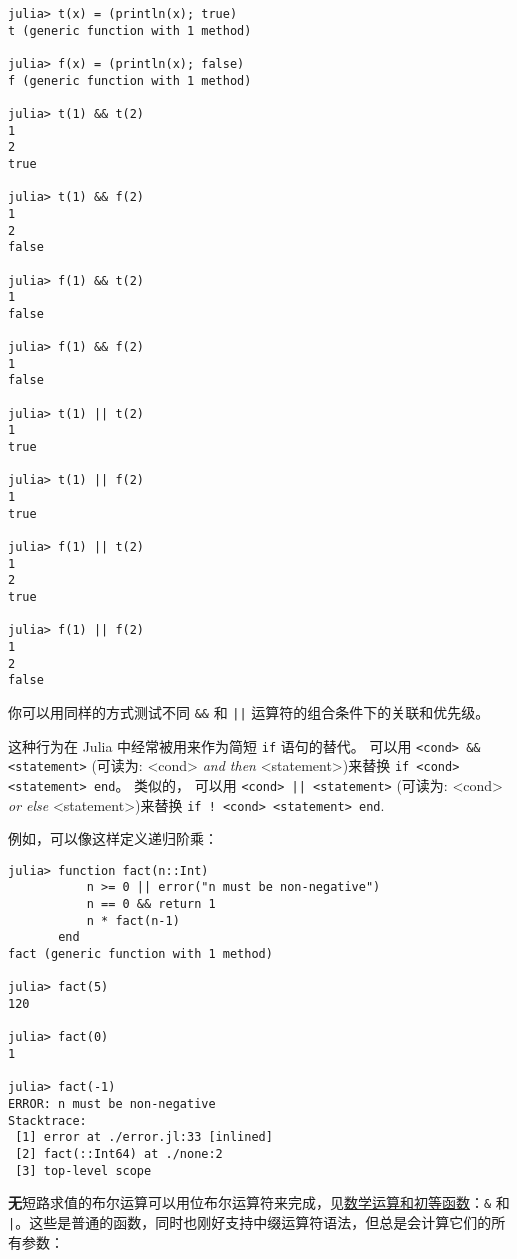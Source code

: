 \begin{verbatim}
julia> t(x) = (println(x); true)
t (generic function with 1 method)

julia> f(x) = (println(x); false)
f (generic function with 1 method)

julia> t(1) && t(2)
1
2
true

julia> t(1) && f(2)
1
2
false

julia> f(1) && t(2)
1
false

julia> f(1) && f(2)
1
false

julia> t(1) || t(2)
1
true

julia> t(1) || f(2)
1
true

julia> f(1) || t(2)
1
2
true

julia> f(1) || f(2)
1
2
false
\end{verbatim}



你可以用同样的方式测试不同 \texttt{\&\&} 和 \texttt{||} 运算符的组合条件下的关联和优先级。



这种行为在 Julia 中经常被用来作为简短 \texttt{if} 语句的替代。 可以用 \texttt{<cond> \&\& <statement>} (可读为: <cond> \emph{and then} <statement>)来替换 \texttt{if <cond> <statement> end}。 类似的， 可以用 \texttt{<cond> || <statement>} (可读为: <cond> \emph{or else} <statement>)来替换 \texttt{if ! <cond> <statement> end}.



例如，可以像这样定义递归阶乘：




\begin{verbatim}
julia> function fact(n::Int)
           n >= 0 || error("n must be non-negative")
           n == 0 && return 1
           n * fact(n-1)
       end
fact (generic function with 1 method)

julia> fact(5)
120

julia> fact(0)
1

julia> fact(-1)
ERROR: n must be non-negative
Stacktrace:
 [1] error at ./error.jl:33 [inlined]
 [2] fact(::Int64) at ./none:2
 [3] top-level scope
\end{verbatim}



\textbf{无}短路求值的布尔运算可以用位布尔运算符来完成，见\hyperlink{16865688524696028421}{数学运算和初等函数}：\texttt{\&} 和 \texttt{|}。这些是普通的函数，同时也刚好支持中缀运算符语法，但总是会计算它们的所有参数：




